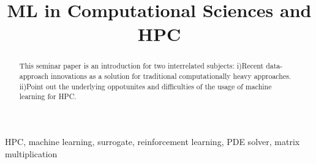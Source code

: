 \documentclass[conference]{IEEEtran}
\begin{document}
\title{ML in Computational Sciences and HPC\\
}
\author{
\and
{}
}

\maketitle

\begin{abstract}
This seminar paper is an introduction for two interrelated subjects: i)Recent data-approach innovations as a solution for traditional
computationally heavy approaches. ii)Point out the underlying oppotunites and difficulties of the usage of machine learning for HPC.
\end{abstract}

\begin{IEEEkeywords}
HPC, machine learning, surrogate, reinforcement learning, PDE solver, matrix multiplication
\end{IEEEkeywords}
\end{document}
